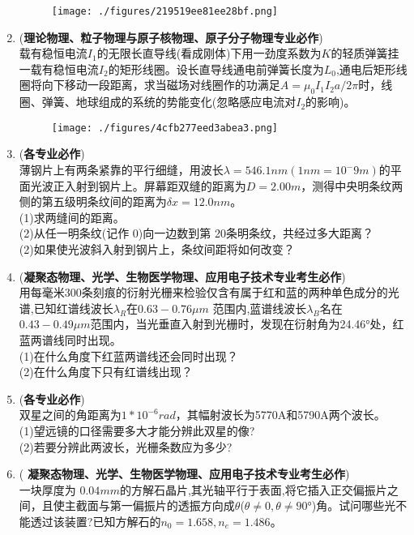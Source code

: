 \begin{enumerate}
\begin{figure}[ht]
\centering
\texttt{[image: ./figures/219519ee81ee28bf.png]}
\caption{} \label{fig_CD06_4}
\end{figure}
\item (\textbf{理论物理、粒子物理与原子核物理、原子分子物理专业必作})\\
载有稳恒电流$I_1$的无限长直导线(看成刚体)下用一劲度系数为$K$的轻质弹簧挂一载有稳恒电流$I_2$的矩形线圈。设长直导线通电前弹簧长度为$L_0$,通电后矩形线圈将向下移动一段距离，求当磁场对线圈作的功满足$A=\mu_0I_1I_2a/2 \pi$时，线圈、弹簧、地球组成的系统的势能变化(忽略感应电流对$I_2$的影响)。
\begin{figure}[ht]
\centering
\texttt{[image: ./figures/4cfb277eed3abea3.png]}
\caption{} \label{fig_CD06_5}
\end{figure}
\item (\textbf{各专业必作})\\
薄钢片上有两条紧靠的平行细缝，用波长$\lambda=546.1nm(1nm=10^-9m)$的平面光波正入射到钢片上。屏幕距双缝的距离为$D=2.00m$，测得中央明条纹两侧的第五级明条纹间的距离为$\delta x=12.0nm$。\\
(1)求两缝间的距离。\\
(2)从任一明条纹(记作 0)向一边数到第 20条明条纹，共经过多大距离？\\
(2)如果使光波斜入射到钢片上，条纹间距将如何改变？
\item (\textbf{凝聚态物理、光学、生物医学物理、应用电子技术专业考生必作})\\
用每毫米$ 300 $条刻痕的衍射光栅来检验仅含有属于红和蓝的两种单色成分的光谱,已知红谱线波长$\lambda_R$在$0.63-0.76\mu m$ 范围内,蓝谱线波长$\lambda_B$名在 $0.43-0.49 \mu m$范围内，当光垂直入射到光栅时，发现在衍射角为24.46°处，红蓝两谱线同时出现。\\
(1)在什么角度下红蓝两谱线还会同时出现？\\
(2)在什么角度下只有红谱线出现？
\item (\textbf{各专业必作})\\
双星之间的角距离为$1*10^{-6}rad$，其幅射波长为5770A和5790A两个波长。\\
(1)望远镜的口径需要多大才能分辨此双星的像?\\
(2)若要分辨此两波长，光栅条数应为多少?
\item ( \textbf{凝聚态物理、光学、生物医学物理、应用电子技术专业考生必作})\\
一块厚度为 $0.04mm$的方解石晶片,其光轴平行于表面,将它插入正交偏振片之间，且使主截面与第一偏振片的透振方向成$\theta$($\theta \neq 0,\theta \neq 90$°)角。试问哪些光不能透过该装置?已知方解石的$n_0=1.658,n_e=1.486$。

\end{enumerate}
